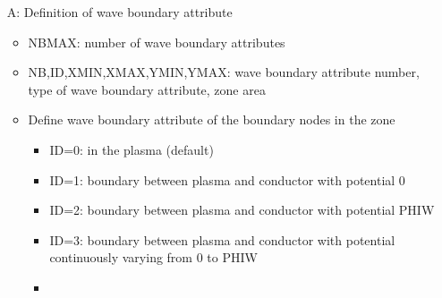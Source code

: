 \begin{enumerate}
\begin{itemize}
\item[A:]
Definition of wave boundary attribute
\begin{itemize}
\item
NBMAX: number of wave boundary attributes
\item
NB,ID,XMIN,XMAX,YMIN,YMAX: wave boundary attribute number, type of
wave boundary attribute, zone area
\item
Define wave boundary attribute of the boundary nodes in the zone
\begin{itemize}
\item
ID=0: in the plasma (default)
\item
ID=1: boundary between plasma and conductor with potential 0
\item
ID=2: boundary between plasma and conductor with potential PHIW
\item
ID=3: boundary between plasma and conductor with potential continuously
varying from 0 to PHIW
\item
\end{itemize}
\end{itemize}


\end{itemize}
\end{enumerate}
